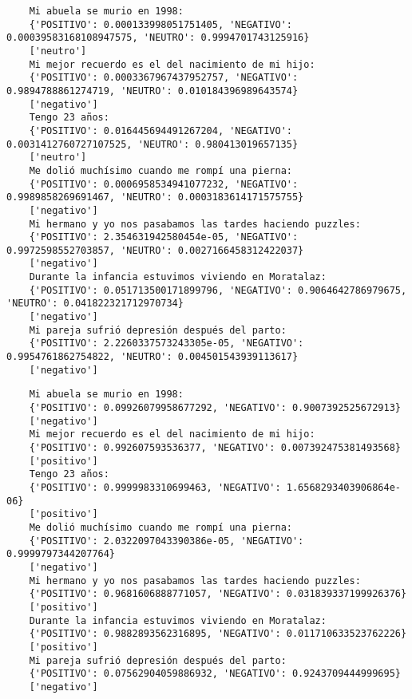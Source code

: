 \begin{verbatim}
	Mi abuela se murio en 1998: 
	{'POSITIVO': 0.000133998051751405, 'NEGATIVO': 0.00039583168108947575, 'NEUTRO': 0.9994701743125916}
	['neutro']
	Mi mejor recuerdo es el del nacimiento de mi hijo: 
	{'POSITIVO': 0.0003367967437952757, 'NEGATIVO': 0.9894788861274719, 'NEUTRO': 0.010184396989643574}
	['negativo']
	Tengo 23 años: 
	{'POSITIVO': 0.016445694491267204, 'NEGATIVO': 0.0031412760727107525, 'NEUTRO': 0.980413019657135}
	['neutro']
	Me dolió muchísimo cuando me rompí una pierna: 
	{'POSITIVO': 0.0006958534941077232, 'NEGATIVO': 0.9989858269691467, 'NEUTRO': 0.0003183614171575755}
	['negativo']
	Mi hermano y yo nos pasabamos las tardes haciendo puzzles: 
	{'POSITIVO': 2.354631942580454e-05, 'NEGATIVO': 0.9972598552703857, 'NEUTRO': 0.0027166458312422037}
	['negativo']
	Durante la infancia estuvimos viviendo en Moratalaz: 
	{'POSITIVO': 0.051713500171899796, 'NEGATIVO': 0.9064642786979675, 'NEUTRO': 0.041822321712970734}
	['negativo']
	Mi pareja sufrió depresión después del parto: 
	{'POSITIVO': 2.2260337573243305e-05, 'NEGATIVO': 0.9954761862754822, 'NEUTRO': 0.004501543939113617}
	['negativo']
\end{verbatim}

\begin{verbatim}
	Mi abuela se murio en 1998: 
	{'POSITIVO': 0.09926079958677292, 'NEGATIVO': 0.9007392525672913}
	['negativo']
	Mi mejor recuerdo es el del nacimiento de mi hijo: 
	{'POSITIVO': 0.992607593536377, 'NEGATIVO': 0.007392475381493568}
	['positivo']
	Tengo 23 años: 
	{'POSITIVO': 0.9999983310699463, 'NEGATIVO': 1.6568293403906864e-06}
	['positivo']
	Me dolió muchísimo cuando me rompí una pierna: 
	{'POSITIVO': 2.0322097043390386e-05, 'NEGATIVO': 0.9999797344207764}
	['negativo']
	Mi hermano y yo nos pasabamos las tardes haciendo puzzles: 
	{'POSITIVO': 0.9681606888771057, 'NEGATIVO': 0.031839337199926376}
	['positivo']
	Durante la infancia estuvimos viviendo en Moratalaz: 
	{'POSITIVO': 0.9882893562316895, 'NEGATIVO': 0.011710633523762226}
	['positivo']
	Mi pareja sufrió depresión después del parto: 
	{'POSITIVO': 0.07562904059886932, 'NEGATIVO': 0.9243709444999695}
	['negativo']
\end{verbatim}



